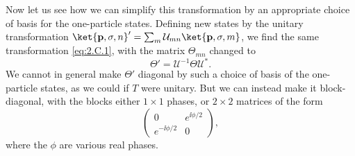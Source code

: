 Now let us see how we can simplify this transformation by an appropriate
choice of basis for the one-particle states. Defining new states by the
unitary transformation
$\ket{\mathbf{p},\sigma,n}'=\sum_m\mathcal{U}_{mn}
\ket{\mathbf{p},\sigma,m}$, we find the same transformation \eqref{eq:2.C.1}, with
the matrix $\Theta_{mn}$ changed to
\begin{equation}
  \Theta'=\mathcal{U}^{-1}\Theta\mathcal{U}^*.
  \tag{2.C.2}\label{eq:2.C.2}
\end{equation}
We cannot in general make $\Theta'$ diagonal by such a choice of basis
of the one-particle states, as we could if $T$ were unitary. But we can
instead make it block-diagonal, with the blocks either $1\times1$ phases, or
$2\times2$ matrices of the form
\begin{equation}
  \begin{pmatrix}
    0 & e^{\ii\phi/2} \\
    e^{-\ii\phi/2} & 0
  \end{pmatrix},
  \tag{2.C.3}\label{eq:2.C.3}
\end{equation}
where the $\phi$ are various real phases.

